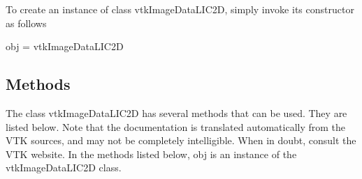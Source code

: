 To create an instance of class vtk\-Image\-Data\-L\-I\-C2\-D, simply invoke its constructor as follows \begin{DoxyVerb}  obj = vtkImageDataLIC2D
\end{DoxyVerb}
 \hypertarget{vtkwidgets_vtkxyplotwidget_Methods}{}\subsection{Methods}\label{vtkwidgets_vtkxyplotwidget_Methods}
The class vtk\-Image\-Data\-L\-I\-C2\-D has several methods that can be used. They are listed below. Note that the documentation is translated automatically from the V\-T\-K sources, and may not be completely intelligible. When in doubt, consult the V\-T\-K website. In the methods listed below, {\ttfamily obj} is an instance of the vtk\-Image\-Data\-L\-I\-C2\-D class. 
